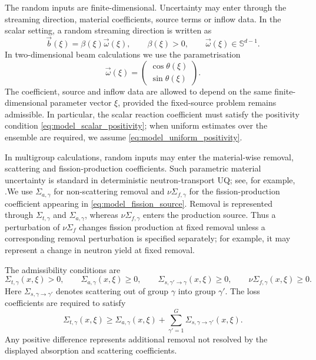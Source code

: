 \documentclass[final]{amsart}
\begin{document}
The random inputs are finite-dimensional. Uncertainty may enter through
the streaming direction, material coefficients, source terms or inflow
data. In the scalar setting, a random streaming direction is written as
\begin{equation}
  \vec b(\xi)=\beta(\xi)\vec\omega(\xi),
  \qquad
  \beta(\xi)>0,
  \qquad
  \vec\omega(\xi)\in\mathbb{S}^{d-1}.
  \label{eq:model_random_direction}
\end{equation}
In two-dimensional beam calculations we use the parametrisation
\begin{equation}
  \vec\omega(\xi)
  =
  \begin{pmatrix}
  \cos{\theta(\xi)}\\
  \sin{\theta(\xi)}
  \end{pmatrix}.
  \label{eq:model_random_angle}
\end{equation}
The coefficient, source and inflow data are allowed to depend on the
same finite-dimensional parameter vector $\xi$, provided the
fixed-source problem remains admissible. In particular, the scalar
reaction coefficient must satisfy the positivity condition
\eqref{eq:model_scalar_positivity}; when uniform estimates over the
ensemble are required, we assume \eqref{eq:model_uniform_positivity}.

In multigroup calculations, random inputs may enter the material-wise
removal, scattering and fission-production coefficients. Such
parametric material uncertainty is standard in deterministic
neutron-transport UQ; see, for example,
\cite{FichtlPrinja2011StochasticCollocation,
  GrahamParkinsonScheichl2018, PasmannEtAl2022iQMC}.We use
$\Sigma_{a,\gamma}$ for non-scattering removal and
$\nu\Sigma_{f,\gamma}$ for the fission-production coefficient
appearing in \eqref{eq:model_fission_source}. Removal is represented
through $\Sigma_{t,\gamma}$ and $\Sigma_{a,\gamma}$, whereas
$\nu\Sigma_{f,\gamma}$ enters the production source. Thus a
perturbation of $\nu\Sigma_f$ changes fission production at fixed
removal unless a corresponding removal perturbation is specified
separately; for example, it may represent a change in neutron yield at
fixed removal.

The admissibility conditions are
\begin{equation}
  \Sigma_{t,\gamma}(x,\xi)>0,
  \qquad
  \Sigma_{a,\gamma}(x,\xi)\geq 0,
  \qquad
  \Sigma_{s,\gamma'\to\gamma}(x,\xi)\geq 0,
  \qquad
  \nu\Sigma_{f,\gamma}(x,\xi)\geq 0.
  \label{eq:model_cross_section_admissibility}
\end{equation}
Here
$\Sigma_{s,\gamma\to\gamma'}$
denotes scattering out of group $\gamma$ into group $\gamma'$.
The loss coefficients are required to satisfy
\begin{equation}
\Sigma_{t,\gamma}(x,\xi)
\geq
\Sigma_{a,\gamma}(x,\xi)
+
\sum_{\gamma'=1}^{G}
\Sigma_{s,\gamma\to\gamma'}(x,\xi).
\label{eq:model_total_cross_section_consistency}
\end{equation}
Any positive difference represents additional removal not resolved by
the displayed absorption and scattering coefficients.
\end{document}
